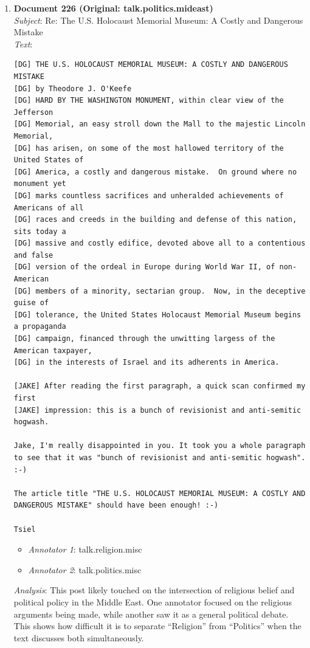 \documentclass{article}
\begin{document}
\begin{enumerate}
    \item \textbf{Document 226 (Original: talk.politics.mideast)} \hfill \\
    \textit{Subject}: Re: The U.S. Holocaust Memorial Museum: A Costly and Dangerous Mistake \\
    \textit{Text}: 
    \begin{lstlisting}[numbers=none]
[DG] THE U.S. HOLOCAUST MEMORIAL MUSEUM: A COSTLY AND DANGEROUS MISTAKE
[DG] by Theodore J. O'Keefe
[DG] HARD BY THE WASHINGTON MONUMENT, within clear view of the Jefferson
[DG] Memorial, an easy stroll down the Mall to the majestic Lincoln Memorial,
[DG] has arisen, on some of the most hallowed territory of the United States of
[DG] America, a costly and dangerous mistake.  On ground where no monument yet
[DG] marks countless sacrifices and unheralded achievements of Americans of all
[DG] races and creeds in the building and defense of this nation, sits today a
[DG] massive and costly edifice, devoted above all to a contentious and false
[DG] version of the ordeal in Europe during World War II, of non-American
[DG] members of a minority, sectarian group.  Now, in the deceptive guise of
[DG] tolerance, the United States Holocaust Memorial Museum begins a propaganda
[DG] campaign, financed through the unwitting largess of the American taxpayer,
[DG] in the interests of Israel and its adherents in America.

[JAKE] After reading the first paragraph, a quick scan confirmed my first
[JAKE] impression: this is a bunch of revisionist and anti-semitic hogwash.

Jake, I'm really disappointed in you. It took you a whole paragraph
to see that it was "bunch of revisionist and anti-semitic hogwash". :-)

The article title "THE U.S. HOLOCAUST MEMORIAL MUSEUM: A COSTLY AND
DANGEROUS MISTAKE" should have been enough! :-)

Tsiel
    \end{lstlisting}
    \begin{itemize}
        \item \textit{Annotator 1}: talk.religion.misc
        \item \textit{Annotator 2}: talk.politics.misc
    \end{itemize}
    \textit{Analysis}: This post likely touched on the intersection of religious belief and political policy in the Middle East. One annotator focused on the religious arguments being made, while another saw it as a general political debate. This shows how difficult it is to separate ``Religion'' from ``Politics'' when the text discusses both simultaneously.


\end{enumerate}
\end{document}
